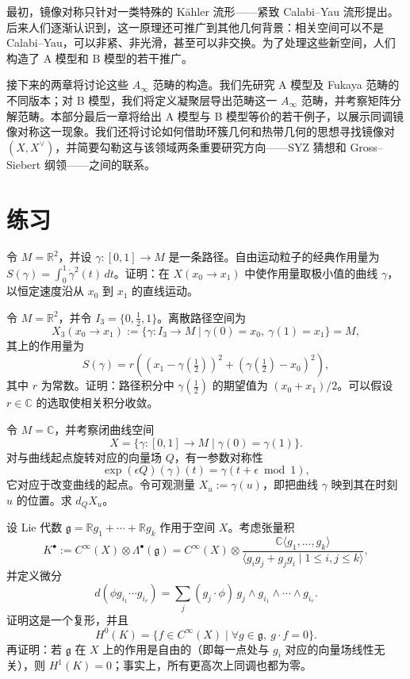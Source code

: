 最初，镜像对称只针对一类特殊的 Kähler 流形——紧致 Calabi--Yau 流形提出。后来人们逐渐认识到，这一原理还可推广到其他几何背景：相关空间可以不是 Calabi--Yau，可以非紧、非光滑，甚至可以非交换。为了处理这些新空间，人们构造了 A 模型和 B 模型的若干推广。

接下来的两章将讨论这些 $A_\infty$ 范畴的构造。我们先研究 A 模型及 Fukaya 范畴的不同版本；对 B 模型，我们将定义凝聚层导出范畴这一 $A_\infty$ 范畴，并考察矩阵分解范畴。本部分最后一章将给出 A 模型与 B 模型等价的若干例子，以展示同调镜像对称这一现象。我们还将讨论如何借助环簇几何和热带几何的思想寻找镜像对 $(X,X^\vee)$，并简要勾勒这与该领域两条重要研究方向——SYZ 猜想和 Gross--Siebert 纲领——之间的联系。

\section{练习}
\begin{exercise}\label{exer:physics-free-particle}
令 $M=\mathbb R^2$，并设 $\gamma\colon[0,1]\to M$ 是一条路径。自由运动粒子的经典作用量为 $S(\gamma)=\int_0^1\dot\gamma^2(t)\,dt$。证明：在 $X(x_0\to x_1)$ 中使作用量取极小值的曲线 $\gamma$，以恒定速度沿从 $x_0$ 到 $x_1$ 的直线运动。
\end{exercise}

\begin{exercise}\label{exer:discrete-path-integral}
令 $M=\mathbb R^2$，并令 $I_3=\{0,\frac12,1\}$。离散路径空间为
\[
  X_3(x_0\to x_1):=\{\gamma\colon I_3\to M\mid
  \gamma(0)=x_0,\ \gamma(1)=x_1\}=M,
\]
其上的作用量为
\[
  S(\gamma)=r\left((x_1-\gamma(\tfrac12))^2+
                     (\gamma(\tfrac12)-x_0)^2\right),
\]
其中 $r$ 为常数。证明：路径积分中 $\gamma(\frac12)$ 的期望值为 $(x_0+x_1)/2$。可以假设 $r\in\mathbb C$ 的选取使相关积分收敛。
\end{exercise}

\begin{exercise}\label{exer:loop-rotation-observable}
令 $M=\mathbb C$，并考察闭曲线空间
\[
  X=\{\gamma\colon[0,1]\to M\mid\gamma(0)=\gamma(1)\}.
\]
对与曲线起点旋转对应的向量场 $Q$，有一参数对称性
\[
  \exp(\epsilon Q)(\gamma)(t)=\gamma(t+\epsilon\bmod1),
\]
它对应于改变曲线的起点。令可观测量 $X_u:=\gamma(u)$，即把曲线 $\gamma$ 映到其在时刻 $u$ 的位置。求 $d_QX_u$。
\end{exercise}

\begin{exercise}\label{exer:lie-algebra-cohomology}
设 Lie 代数 $\mathfrak g=\mathbb Rg_1+\cdots+\mathbb Rg_k$ 作用于空间 $X$。考虑张量积
\[
  K^\bullet:=C^\infty(X)\otimes\Lambda^\bullet(\mathfrak g)
  =C^\infty(X)\otimes
  \frac{\mathbb C\langle g_1,\ldots,g_k\rangle}
  {\langle g_ig_j+g_jg_i\mid1\le i,j\le k\rangle},
\]
并定义微分
\[
  d(\phi g_{i_1}\cdots g_{i_r})=
  \sum_j(g_j\cdot\phi)\,g_j\wedge g_{i_1}\wedge\cdots\wedge g_{i_r}.
\]
证明这是一个复形，并且
\[
  H^0(K)=\{f\in C^\infty(X)\mid
     \forall g\in\mathfrak g,\ g\cdot f=0\}.
\]
再证明：若 $\mathfrak g$ 在 $X$ 上的作用是自由的（即每一点处与 $g_i$ 对应的向量场线性无关），则 $H^1(K)=0$；事实上，所有更高次上同调也都为零。
\end{exercise}

